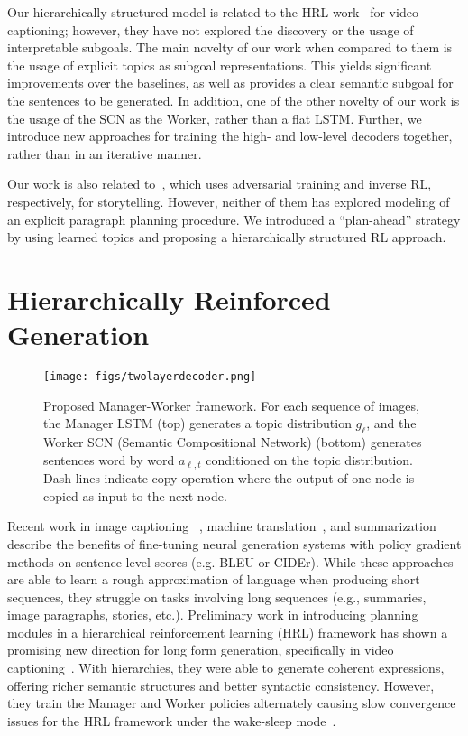 \documentclass[letterpaper]{article} \usepackage{aaai19}  \usepackage{times}  \usepackage{helvet}  \usepackage{courier}  \usepackage{url}  \usepackage{graphicx}
\begin{document}
Our hierarchically structured model is related to the HRL work~\cite{wang2018video} for video captioning; however, they have not explored the discovery or the usage of interpretable subgoals. The main novelty of our work when compared to them is the usage of explicit topics as subgoal representations. This yields significant improvements over the baselines, as well as provides a clear semantic subgoal for the sentences to be generated. In addition, one of the other novelty of our work is the usage of the SCN as the Worker, rather than a flat LSTM. Further, we introduce new approaches for training the high- and low-level decoders together, rather than in an iterative manner.

Our work is also related to~\cite{wang2018show,wang2018no}, which uses adversarial training and inverse RL, respectively, for storytelling. However, neither of them has explored modeling of an explicit paragraph planning procedure. We introduced a ``plan-ahead'' strategy by using learned topics and proposing a hierarchically structured RL approach.

\section{Hierarchically Reinforced Generation} \label{sec:model_description}
\begin{figure*}[t]
	\centering
	\texttt{[image: figs/twolayerdecoder.png]}		
	\caption{\small Proposed Manager-Worker framework. For each sequence of images, the Manager LSTM (top) generates a topic distribution $g_{\ell}$, and the Worker SCN (Semantic Compositional Network) (bottom) generates sentences word by word $a_{\ell,t}$ conditioned on the topic distribution. Dash lines indicate copy operation where the output of one node is copied as input to the next node.}
	\label{fig:implementation_hrl_agent}
\end{figure*}

Recent work in image captioning ~\cite{Rennie2016Self,Pasunuru2017Reinforced}, machine translation~\cite{wu2016google}, and summarization~\cite{paulus2017deep,Celikyilmaz2018DCA} describe the benefits of fine-tuning neural generation systems with policy gradient methods on sentence-level scores (e.g. BLEU or CIDEr). 
While these approaches are able to learn a rough approximation of language when producing short sequences, they struggle on tasks involving long sequences (e.g., summaries, image paragraphs, stories, etc.). 
Preliminary work in introducing planning modules in a hierarchical reinforcement learning (HRL) framework has shown a promising new direction for long form generation, specifically in video captioning~\cite{wang2018video}. 
With hierarchies, they were able to generate coherent expressions, offering richer semantic structures and better syntactic consistency. However, they train the Manager and Worker policies
alternately causing slow convergence issues for the HRL framework under the wake-sleep mode~\cite{Neal1996}. 
\end{document}
